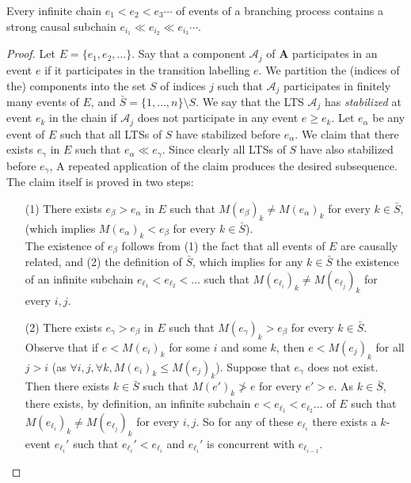 \documentclass{llncs}
\def\A{\mathcal{A}}
\def\prod{\mathbf{A}}
\def\scause{\ll}
\begin{document}
\begin{lemma}
\label{lem:causal}
Every infinite chain $e_1 < e_2 < e_3 \cdots$ of events of a branching process
contains a strong causal subchain $e_{i_1} \scause e_{i_2} \scause e_{i_3} \cdots$. 
\end{lemma}
\begin{proof}
Let $E=\{e_1,e_2,\dots\}$. Say that a component $\A_j$ of $\prod$ participates
in an event $e$ if it participates in the transition labelling $e$. We partition the (indices of the)
components into the set $S$ of indices $j$ such that $\A_j$ participates in finitely many 
events of $E$, and $\bar{S} = \{1,\ldots,n\} \setminus S$. We say that the LTS $\A_j$ has 
{\em stabilized} at event $e_k$ in the chain if $\A_j$ does not participate in any event $e \geq  e_k$. 
Let $e_{\alpha}$ be any event of $E$ such that all LTSs of $S$ 
have stabilized before $e_{\alpha}$. We claim that there exists $e_\gamma$ in $E$ such that
$e_{\alpha} \scause e_{\gamma}$. Since clearly all LTSs of $S$ have also stabilized before $e_\gamma$,
A repeated application of the claim produces the desired subsequence. The claim itself
is proved in two steps:
\begin{itemize}
\item[(1)] There exists $e_{\beta} > e_{\alpha}$ in $E$ such that $M(e_{\beta})_k\neq M(e_{\alpha})_k$
for every $k\in\bar{S}$, (which implies $M(e_{\alpha})_k < e_\beta$ for every $k\in\bar{S}$).\\
The existence of $e_\beta$ follows from (1) the fact that all events of $E$ are causally related, and (2) the definition of $\bar{S}$, which implies for any $k\in\bar{S}$ the existence of an infinite subchain $e_{\ell_1}<e_{\ell_2}<\dots$ such that $M(e_{\ell_i})_k\neq M(e_{\ell_j})_k$ for every $i,j$.
\item[(2)] There exists $e_{\gamma} > e_{\beta}$ in $E$ such that $M(e_{\gamma})_k>e_\beta$ for every $k\in\bar{S}$.\\
Observe that if $e<M(e_i)_k$ for some $i$ and some $k$, then $e<M(e_j)_k$ for all $j>i$ (as $\forall i,j, \forall k,  M(e_i)_k\leq M(e_j)_k$).
Suppose that $e_\gamma$ does not exist.
Then there exists $k\in\bar{S}$ such that $M(e')_k\ngtr e$ for every $e'>e$.
As $k\in\bar{S}$, there exists, by definition, an infinite subchain $e<e_{\ell_1}<e_{\ell_2}\dots$ of $E$ such that $M(e_{\ell_i})_k\neq M(e_{\ell_j})_k$ for every $i,j$.
So for any of these $e_{\ell_i}$ there exists a $k$-event $e_{\ell_i}'$ such that 
$e_{\ell_i}'<e_{\ell_i}$ and $e_{\ell_i}'$ is concurrent with $e_{\ell_{i-1}}$.

\end{itemize}
\end{proof}
\end{document}
